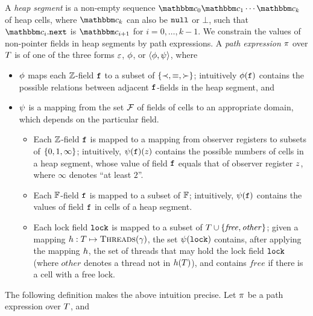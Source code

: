 A {\em heap segment} is a non-empty sequence
$\cell_0 \cell_1 \cdots \cell_k$ of heap cells, where $\cell_k$ can also
be ${\tt null}$ or $\bot$, such that
$\cell_i.\mbox{\tt next}$ is $\cell_{i+1}$ for $i = 0 , \ldots , k-1$.
We constrain the values of non-pointer fields
in heap segments by path expressions.
A {\em path expression} $\pi$ over $T$ is of one of the three forms
$\varepsilon$, $\phi$, or 
$\left\langle\phi,\psi\right\rangle$,
where
\begin{itemize}
  \item $\phi$ maps each ${\mathbb Z}$-field $\mathtt{f}$ to
a subset of ${\left\{\prec,\equiv,\succ\right\}}$; intuitively
$\phi(\mathtt{f})$ contains the possible relations between adjacent
$\mathtt{f}$-fields in the heap segment, and
\item
  $\psi$ is a mapping from the set $\mathcal{F}$ of fields of
cells to an appropriate
domain, which depends on the particular field.
\begin{itemize}
\item
  Each ${\mathbb Z}$-field $\mathtt{f}$ is mapped to a mapping from
  observer registers to subsets of $\left\{0,1,\infty\right\}$;
  intuitively, $\psi(\mathtt{f})(z)$ contains the possible numbers of cells
  in a heap segment, whose value of field $\mathtt{f}$ equals that of
  observer register $z$, where $\infty$ denotes ``at least $2$''.
\item Each $\mathbb{F}$-field $\mathtt{f}$ is mapped
  to a subset of $\mathbb{F}$;
  intuitively, $\psi(\mathtt{f})$ contains the values of field $\mathtt{f}$ in
  cells of a heap segment.
\item
  Each lock field $\mathtt{lock}$ is mapped to a subset of
  $T \cup \left\{\mathit{free},\mathit{other}\right\}$;
  given a mapping $h: T \mapsto \mbox{\sc Threads}(\gamma)$,
  the set $\psi(\mathtt{lock})$ contains, after applying the mapping $h$,
  the set of threads that may
  hold the lock field $\mathtt{lock}$  (where $\mathit{other}$ denotes a thread
  not in $h(T)$), and contains $\mathit{free}$ if there is a cell
  with a free lock.
\end{itemize}
\end{itemize}
\vspace{-2mm}
The following definition makes the above intuition precise.
Let $\pi$ be a path expression over $T$, and
